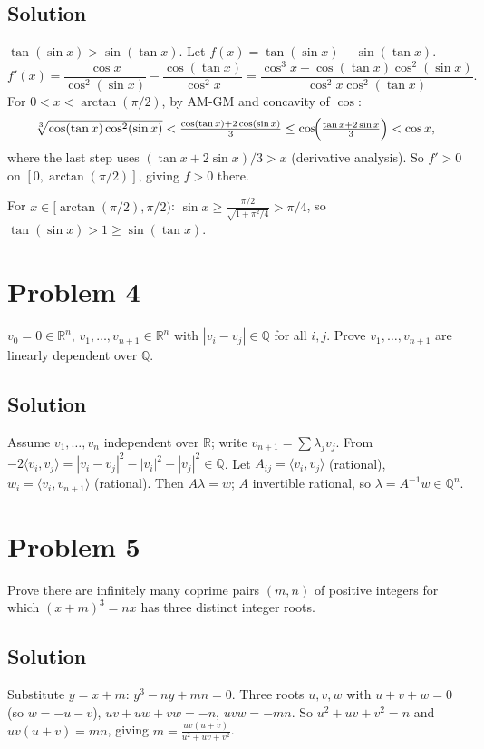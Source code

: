 \documentclass{article}
\begin{document}
\subsection*{Solution}
$\tan(\sin x) > \sin(\tan x)$. Let $f(x) = \tan(\sin x) - \sin(\tan x)$.
\[
f'(x) = \frac{\cos x}{\cos^2(\sin x)} - \frac{\cos(\tan x)}{\cos^2 x} = \frac{\cos^3 x - \cos(\tan x) \cos^2(\sin x)}{\cos^2 x \cos^2(\tan x)}.
\]
For $0 < x < \arctan(\pi/2)$, by AM-GM and concavity of $\cos$:
\[
\sqrt[3]{\cos(\tan x) \cos^2(\sin x)} < \tfrac{\cos(\tan x) + 2 \cos(\sin x)}{3} \le \cos\!\Bigl(\tfrac{\tan x + 2 \sin x}{3}\Bigr) < \cos x,
\]
where the last step uses $(\tan x + 2 \sin x)/3 > x$ (derivative analysis). So $f' > 0$ on $[0, \arctan(\pi/2)]$, giving $f > 0$ there.

For $x \in [\arctan(\pi/2), \pi/2)$: $\sin x \ge \tfrac{\pi/2}{\sqrt{1 + \pi^2/4}} > \pi/4$, so $\tan(\sin x) > 1 \ge \sin(\tan x)$.

\section*{Problem 4}
$v_0 = 0 \in \mathbb{R}^n$, $v_1, \ldots, v_{n+1} \in \mathbb{R}^n$ with $|v_i - v_j| \in \mathbb{Q}$ for all $i, j$. Prove $v_1, \ldots, v_{n+1}$ are linearly dependent over $\mathbb{Q}$.

\subsection*{Solution}
Assume $v_1, \ldots, v_n$ independent over $\mathbb{R}$; write $v_{n+1} = \sum \lambda_j v_j$. From $-2 \langle v_i, v_j\rangle = |v_i - v_j|^2 - |v_i|^2 - |v_j|^2 \in \mathbb{Q}$. Let $A_{ij} = \langle v_i, v_j\rangle$ (rational), $w_i = \langle v_i, v_{n+1}\rangle$ (rational). Then $A\lambda = w$; $A$ invertible rational, so $\lambda = A^{-1} w \in \mathbb{Q}^n$.

\section*{Problem 5}
Prove there are infinitely many coprime pairs $(m, n)$ of positive integers for which $(x+m)^3 = nx$ has three distinct integer roots.

\subsection*{Solution}
Substitute $y = x + m$: $y^3 - n y + mn = 0$. Three roots $u, v, w$ with $u + v + w = 0$ (so $w = -u-v$), $uv + uw + vw = -n$, $uvw = -mn$. So $u^2 + uv + v^2 = n$ and $uv(u+v) = mn$, giving $m = \tfrac{uv(u+v)}{u^2 + uv + v^2}$.
\end{document}
